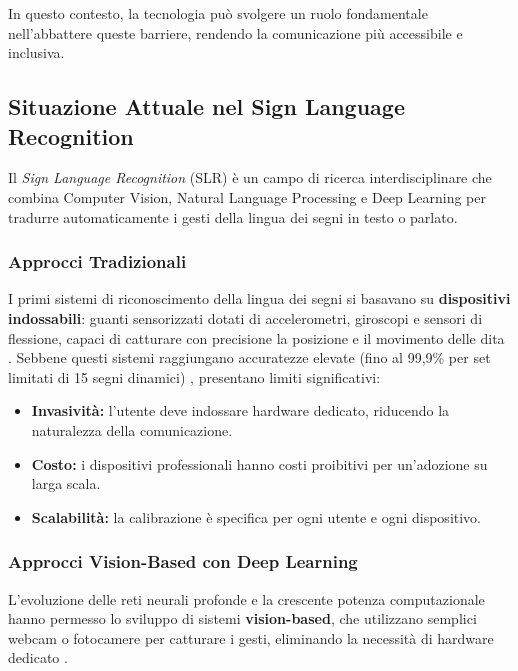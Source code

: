 In questo contesto, la tecnologia può svolgere un ruolo fondamentale nell'abbattere queste barriere, rendendo la comunicazione più accessibile e inclusiva.


\subsection{Situazione Attuale nel Sign Language Recognition}

Il \textit{Sign Language Recognition} (SLR) è un campo di ricerca interdisciplinare che combina Computer Vision, Natural Language Processing e Deep Learning per tradurre automaticamente i gesti della lingua dei segni in testo o parlato.

\subsubsection{Approcci Tradizionali}

I primi sistemi di riconoscimento della lingua dei segni si basavano su \textbf{dispositivi indossabili}: guanti sensorizzati dotati di accelerometri, giroscopi e sensori di flessione, capaci di catturare con precisione la posizione e il movimento delle dita \cite{kumar2024slr}. Sebbene questi sistemi raggiungano accuratezze elevate (fino al 99,9\% per set limitati di 15 segni dinamici) \cite{kumar2024slr}, presentano limiti significativi:
\begin{itemize}
    \item \textbf{Invasività:} l'utente deve indossare hardware dedicato, riducendo la naturalezza della comunicazione.
    \item \textbf{Costo:} i dispositivi professionali hanno costi proibitivi per un'adozione su larga scala.
    \item \textbf{Scalabilità:} la calibrazione è specifica per ogni utente e ogni dispositivo.
\end{itemize}

\subsubsection{Approcci Vision-Based con Deep Learning}

L'evoluzione delle reti neurali profonde e la crescente potenza computazionale hanno permesso lo sviluppo di sistemi \textbf{vision-based}, che utilizzano semplici webcam o fotocamere per catturare i gesti, eliminando la necessità di hardware dedicato \cite{rastgoo2024slrsurvey}.

